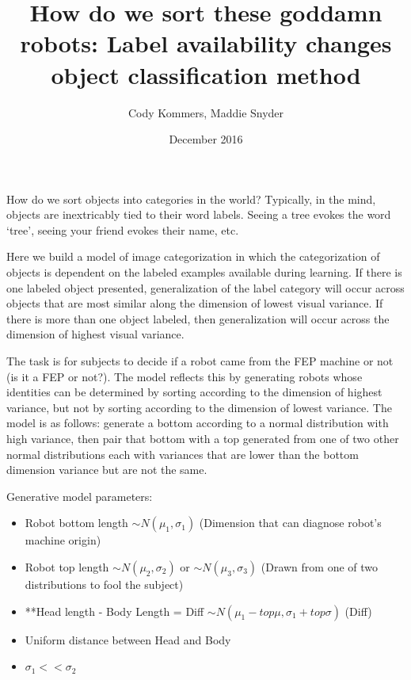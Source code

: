 \documentclass[12pt]{article}
\title{How do we sort these goddamn robots: Label availability changes object classification method}
\author{Cody Kommers, Maddie Snyder}
\date{December 2016}
\begin{document}
\maketitle

\noindent How do we sort objects into categories in the world? Typically, in the mind, objects are inextricably tied to their word labels. Seeing a tree evokes the word `tree', seeing your friend evokes their name, etc. 

\vspace{.2in}

\noindent Here we build a model of image categorization in which the categorization of objects is dependent on the labeled examples available during learning. If there is one labeled object presented, generalization of the label category will occur across objects that are most similar along the dimension of lowest visual variance. If there is more than one object labeled, then generalization will occur across the dimension of highest visual variance. 

\vspace{.2in}

\noindent The task is for subjects to decide if a robot came from the FEP machine or not (is it a FEP or not?). The model reflects this by generating robots whose identities can be determined by sorting according to the dimension of highest variance, but not by sorting according to the dimension of lowest variance. The model is as follows: generate a bottom according to a normal distribution with high variance, then pair that bottom with a top generated from one of two other normal distributions each with variances that are lower than the bottom dimension variance but are not the same. 

\vspace{.2in}

\noindent Generative model parameters:
\begin{itemize}
	\item Robot bottom length $\sim N(\mu_1, \sigma_1)$ (Dimension that can diagnose robot's machine origin)
	\item Robot top length $\sim N(\mu_2, \sigma_2)$ or $\sim N(\mu_3, \sigma_3)$ (Drawn from one of two distributions to fool the subject)
	\item **Head length - Body Length = Diff $\sim N(\mu_1 - top\mu, \sigma_1 + top\sigma)$ (Diff)
	\item Uniform distance between Head and Body
	\item $\sigma_1 << \sigma_2$
\end{itemize}
\end{document}
